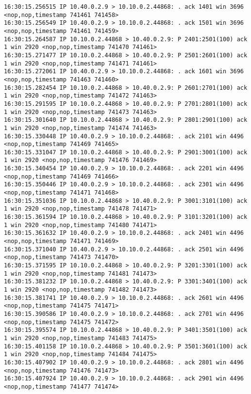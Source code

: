 \documentclass[a4paper,12pt]{article}
\begin{document}
\begin{Verbatim}
16:30:15.256515 IP 10.40.0.2.9 > 10.10.0.2.44868: . ack 1401 win 3696 <nop,nop,timestamp 741461 741458>
16:30:15.256549 IP 10.40.0.2.9 > 10.10.0.2.44868: . ack 1501 win 3696 <nop,nop,timestamp 741461 741459>
16:30:15.264587 IP 10.10.0.2.44868 > 10.40.0.2.9: P 2401:2501(100) ack 1 win 2920 <nop,nop,timestamp 741470 741461>
16:30:15.271477 IP 10.10.0.2.44868 > 10.40.0.2.9: P 2501:2601(100) ack 1 win 2920 <nop,nop,timestamp 741471 741461>
16:30:15.272061 IP 10.40.0.2.9 > 10.10.0.2.44868: . ack 1601 win 3696 <nop,nop,timestamp 741463 741460>
16:30:15.282454 IP 10.10.0.2.44868 > 10.40.0.2.9: P 2601:2701(100) ack 1 win 2920 <nop,nop,timestamp 741472 741463>
16:30:15.291595 IP 10.10.0.2.44868 > 10.40.0.2.9: P 2701:2801(100) ack 1 win 2920 <nop,nop,timestamp 741473 741463>
16:30:15.301640 IP 10.10.0.2.44868 > 10.40.0.2.9: P 2801:2901(100) ack 1 win 2920 <nop,nop,timestamp 741474 741463>
16:30:15.330448 IP 10.40.0.2.9 > 10.10.0.2.44868: . ack 2101 win 4496 <nop,nop,timestamp 741469 741465>
16:30:15.331047 IP 10.10.0.2.44868 > 10.40.0.2.9: P 2901:3001(100) ack 1 win 2920 <nop,nop,timestamp 741476 741469>
16:30:15.340454 IP 10.40.0.2.9 > 10.10.0.2.44868: . ack 2201 win 4496 <nop,nop,timestamp 741469 741466>
16:30:15.350446 IP 10.40.0.2.9 > 10.10.0.2.44868: . ack 2301 win 4496 <nop,nop,timestamp 741471 741468>
16:30:15.351036 IP 10.10.0.2.44868 > 10.40.0.2.9: P 3001:3101(100) ack 1 win 2920 <nop,nop,timestamp 741478 741471>
16:30:15.361594 IP 10.10.0.2.44868 > 10.40.0.2.9: P 3101:3201(100) ack 1 win 2920 <nop,nop,timestamp 741480 741471>
16:30:15.361632 IP 10.40.0.2.9 > 10.10.0.2.44868: . ack 2401 win 4496 <nop,nop,timestamp 741471 741469>
16:30:15.371040 IP 10.40.0.2.9 > 10.10.0.2.44868: . ack 2501 win 4496 <nop,nop,timestamp 741473 741470>
16:30:15.371595 IP 10.10.0.2.44868 > 10.40.0.2.9: P 3201:3301(100) ack 1 win 2920 <nop,nop,timestamp 741481 741473>
16:30:15.381232 IP 10.10.0.2.44868 > 10.40.0.2.9: P 3301:3401(100) ack 1 win 2920 <nop,nop,timestamp 741482 741473>
16:30:15.381741 IP 10.40.0.2.9 > 10.10.0.2.44868: . ack 2601 win 4496 <nop,nop,timestamp 741475 741471>
16:30:15.390586 IP 10.40.0.2.9 > 10.10.0.2.44868: . ack 2701 win 4496 <nop,nop,timestamp 741475 741472>
16:30:15.395574 IP 10.10.0.2.44868 > 10.40.0.2.9: P 3401:3501(100) ack 1 win 2920 <nop,nop,timestamp 741483 741475>
16:30:15.401158 IP 10.10.0.2.44868 > 10.40.0.2.9: P 3501:3601(100) ack 1 win 2920 <nop,nop,timestamp 741484 741475>
16:30:15.407902 IP 10.40.0.2.9 > 10.10.0.2.44868: . ack 2801 win 4496 <nop,nop,timestamp 741476 741473>
16:30:15.407924 IP 10.40.0.2.9 > 10.10.0.2.44868: . ack 2901 win 4496 <nop,nop,timestamp 741477 741474>

\end{Verbatim}
\end{document}
